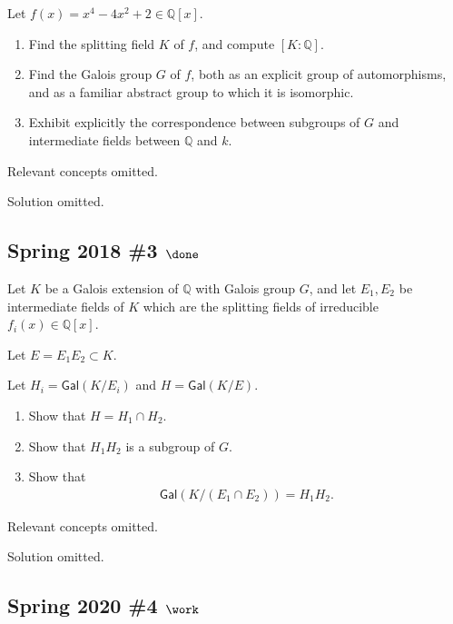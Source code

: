 Let \(f(x) = x^4 - 4x^2 + 2 \in {\mathbb{Q}}[x]\).

\begin{enumerate}
\def\labelenumi{\alph{enumi}.}
\item
  Find the splitting field \(K\) of \(f\), and compute
  \([K: {\mathbb{Q}}]\).
\item
  Find the Galois group \(G\) of \(f\), both as an explicit group of
  automorphisms, and as a familiar abstract group to which it is
  isomorphic.
\item
  Exhibit explicitly the correspondence between subgroups of \(G\) and
  intermediate fields between \({\mathbb{Q}}\) and \(k\).
\end{enumerate}


Relevant concepts omitted.

Solution omitted.

\hypertarget{spring-2018-3-done}{%
\subsection{\texorpdfstring{Spring 2018 \#3
\(\done\)}{Spring 2018 \#3 \textbackslash done}}\label{spring-2018-3-done}}

Let \(K\) be a Galois extension of \({\mathbb{Q}}\) with Galois group
\(G\), and let \(E_1 , E_2\) be intermediate fields of \(K\) which are
the splitting fields of irreducible \(f_i (x) \in {\mathbb{Q}}[x]\).

Let \(E = E_1 E_2 \subset K\).

Let \(H_i = { \mathsf{Gal}} (K/E_i)\) and \(H = { \mathsf{Gal}} (K/E)\).

\begin{enumerate}
\def\labelenumi{\alph{enumi}.}
\item
  Show that \(H = H_1 \cap H_2\).
\item
  Show that \(H_1 H_2\) is a subgroup of \(G\).
\item
  Show that
  \begin{align*}
  { \mathsf{Gal}} (K/(E_1 \cap E_2 )) = H_1 H_2
  .\end{align*}
\end{enumerate}

Relevant concepts omitted.

Solution omitted.

\hypertarget{spring-2020-4-work}{%
\subsection{\texorpdfstring{Spring 2020 \#4
\(\work\)}{Spring 2020 \#4 \textbackslash work}}\label{spring-2020-4-work}}

